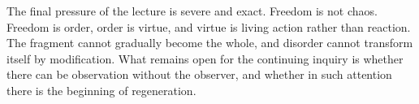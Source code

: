 The final pressure of the lecture is severe and exact. Freedom is not chaos. Freedom is order, order is virtue, and virtue is living action rather than reaction. The fragment cannot gradually become the whole, and disorder cannot transform itself by modification. What remains open for the continuing inquiry is whether there can be observation without the observer, and whether in such attention there is the beginning of regeneration.